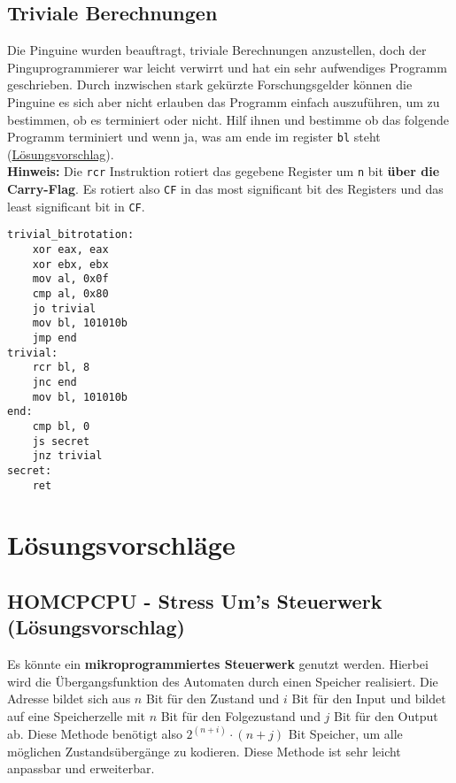 \documentclass{article}
\begin{document}
\newpage

\subsection{Triviale Berechnungen}
Die Pinguine wurden beauftragt, triviale Berechnungen anzustellen, doch der Pinguprogrammierer war leicht verwirrt und hat ein sehr aufwendiges Programm geschrieben. Durch inzwischen stark gekürzte Forschungsgelder können die Pinguine es sich aber nicht erlauben das Programm einfach auszuführen, um zu bestimmen, ob es terminiert oder nicht. Hilf ihnen und bestimme ob das folgende Programm terminiert und wenn ja, was am ende im register \texttt{bl} steht (\hyperref[sec:lsg03]{Lösungsvorschlag}). \\ \newline
\textbf{Hinweis: } Die \texttt{rcr} Instruktion rotiert das gegebene Register um \texttt{n} bit \textbf{über die Carry-Flag}. Es rotiert also \texttt{CF} in das most significant bit des Registers und das least significant bit in \texttt{CF}.

\begin{verbatim}
trivial_bitrotation:
    xor eax, eax
    xor ebx, ebx
    mov al, 0x0f
    cmp al, 0x80
    jo trivial
    mov bl, 101010b
    jmp end
trivial:
    rcr bl, 8
    jnc end
    mov bl, 101010b
end:
    cmp bl, 0
    js secret
    jnz trivial
secret:
    ret
\end{verbatim}

\newpage

\section{Lösungsvorschläge}

\subsection{HOMCPCPU - Stress Um's Steuerwerk (Lösungsvorschlag)}
\label{sec:lsg02}
Es könnte ein \textbf{mikroprogrammiertes Steuerwerk} genutzt werden. Hierbei wird die Übergangsfunktion des Automaten durch einen Speicher realisiert. Die Adresse bildet sich aus $n$ Bit für den Zustand und $i$ Bit für den Input und bildet auf eine Speicherzelle mit $n$ Bit für den Folgezustand und $j$ Bit für den Output ab. Diese Methode benötigt also $2^{(n + i)} \cdot (n + j)$ Bit Speicher, um alle möglichen Zustandsübergänge zu kodieren. Diese Methode ist sehr leicht anpassbar und erweiterbar.
\end{document}

